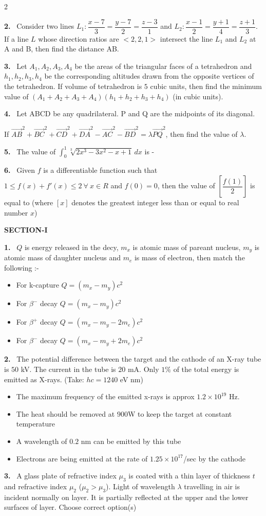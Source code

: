 \documentclass[10pt]{extarticle}
\newcommand{\papersec}[1]{\par\bigskip{\centering\Large\bfseries PAPER-#1\par}\medskip}
\newcommand{\partsec}[2]{\par\medskip\noindent{\large\bfseries PART-#1: #2}\par\smallskip}
\newcommand{\sect}[1]{\par\smallskip\noindent\textbf{#1}\par}
\newcommand{\qn}[1]{\par\smallskip\noindent\textbf{#1.}~}
\newenvironment{qoptions}{\begin{itemize}[leftmargin=1.8em,itemsep=1pt,topsep=2pt,label={}]}{\end{itemize}}
\newcommand{\opt}[2]{\item[(#1)] #2}
\begin{document}
\begin{multicols}{2}
\qn{2} Consider two lines $L_1:\dfrac{x-7}{3}=\dfrac{y-7}{2}=\dfrac{z-3}{1}$ and $L_2:\dfrac{x-1}{2}=\dfrac{y+1}{4}=\dfrac{z+1}{3}$. If a line $L$ whose direction ratios are $<2,2,1>$ intersect the line $L_1$ and $L_2$ at A and B, then find the distance AB.
\qn{3} Let $A_1,A_2,A_3,A_4$ be the areas of the triangular faces of a tetrahedron and $h_1,h_2,h_3,h_4$ be the corresponding altitudes drawn from the opposite vertices of the tetrahedron. If volume of tetrahedron is $5$ cubic units, then find the minimum value of $(A_1+A_2+A_3+A_4)(h_1+h_2+h_3+h_4)$ (in cubic units).
\qn{4} Let ABCD be any quadrilateral. P and Q are the midpoints of its diagonal.

If $\overrightarrow{AB}^2+\overrightarrow{BC}^2+\overrightarrow{CD}^2+\overrightarrow{DA}^2-\overrightarrow{AC}^2-\overrightarrow{BD}^2=\lambda\overrightarrow{PQ}^2$, then find the value of $\lambda$.
\qn{5} The value of $\displaystyle\int_0^1\sqrt[3]{2x^3-3x^2-x+1}\,dx$ is -
\qn{6} Given $f$ is a differentiable function such that $1\leqslant f(x)+f'(x)\leqslant2\ \forall\ x\in R$ and $f(0)=0$, then the value of $\left[\dfrac{f(1)}{2}\right]$ is equal to (where $[x]$ denotes the greatest integer less than or equal to real number $x$)
\raggedcolumns
\papersec{2}
\partsec{1}{PHYSICS}
\sect{SECTION-I}
\qn{1} $Q$ is energy released in the decy, $m_x$ is atomic mass of pareant nucleus, $m_y$ is atomic mass of daughter nucleus and $m_e$ is mass of electron, then match the following :-
\begin{qoptions}
\opt{A}{For k-capture $Q=(m_x-m_y)c^2$}
\opt{B}{For $\beta^-$ decay $Q=(m_x-m_y)c^2$}
\opt{C}{For $\beta^+$ decay $Q=(m_x-m_y-2m_e)c^2$}
\opt{D}{For $\beta^-$ decay $Q=(m_x-m_y+2m_e)c^2$}
\end{qoptions}
\qn{2} The potential difference between the target and the cathode of an X-ray tube is $50$ kV. The current in the tube is $20$ mA. Only $1\%$ of the total energy is emitted as X-rays. (Take: $hc=1240$ eV nm)
\begin{qoptions}
\opt{A}{The maximum frequency of the emitted x-rays is approx $1.2\times10^{19}$ Hz.}
\opt{B}{The heat should be removed at $900$W to keep the target at constant temperature}
\opt{C}{A wavelength of $0.2$ nm can be emitted by this tube}
\opt{D}{Electrons are being emitted at the rate of $1.25\times10^{17}$/sec by the cathode}
\end{qoptions}
\qn{3} A glass plate of refractive index $\mu_3$ is coated with a thin layer of thickness $t$ and refractive index $\mu_2$ ($\mu_2>\mu_3$). Light of wavelength $\lambda$ travelling in air is incident normally on layer. It is partially reflected at the upper and the lower surfaces of layer. Choose correct option(s)

\end{multicols}
\end{document}
